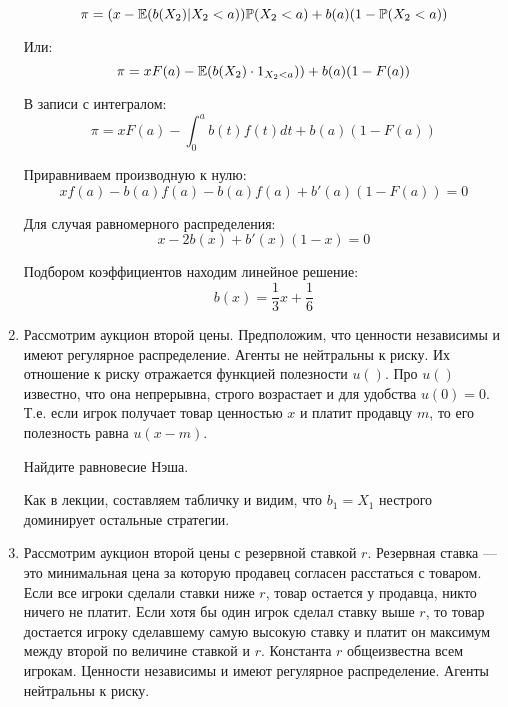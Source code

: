 \begin{enumerate}
\begin{equation}
\pi=(x-\mathbb{E}(b(X_{2})|X_{2}<a))\mathbb{P}(X_{2}<a)+b(a)(1-\mathbb{P}(X_{2}<a))
\end{equation}

Или:
\begin{equation}
\pi=xF(a)-\mathbb{E}(b(X_{2})\cdot 1_{X_{2}<a}))+b(a)(1-F(a))
\end{equation}

В записи с интегралом:
\begin{equation}
\pi=xF(a)-\int_{0}^{a}b(t)f(t)dt+b(a)(1-F(a))
\end{equation}

Приравниваем производную к нулю:
\begin{equation}
xf(a)-b(a)f(a)-b(a)f(a)+b'(a)(1-F(a))=0
\end{equation}

Для случая равномерного распределения:
\begin{equation}
x-2b(x)+b'(x)(1-x)=0
\end{equation}

Подбором коэффициентов находим линейное решение:
\begin{equation}
b(x)=\frac{1}{3}x+\frac{1}{6}
\end{equation}


\item Рассмотрим аукцион второй цены. Предположим, что ценности независимы и имеют регулярное распределение. Агенты не нейтральны к риску. Их отношение к риску отражается функцией полезности $ u() $. Про $ u() $ известно, что она непрерывна, строго возрастает и для удобства $ u(0)=0 $. Т.е. если игрок получает товар ценностью $ x $ и платит продавцу $ m $, то его полезность равна $ u(x-m) $. 

Найдите равновесие Нэша.

Как в лекции, составляем табличку и видим, что $ b_{1}=X_{1} $ нестрого доминирует остальные стратегии.


\item Рассмотрим аукцион второй цены с резервной ставкой $ r $. Резервная ставка --- это минимальная цена за которую продавец согласен расстаться с товаром. Если все игроки сделали ставки ниже $ r $, товар остается у продавца, никто ничего не платит. Если хотя бы один игрок сделал ставку выше $ r $, то товар достается игроку сделавшему самую высокую ставку и платит он максимум между второй по величине ставкой и $ r $. Константа $ r $ общеизвестна всем игрокам. Ценности независимы и имеют регулярное распределение. Агенты нейтральны к риску. 


\end{enumerate}
